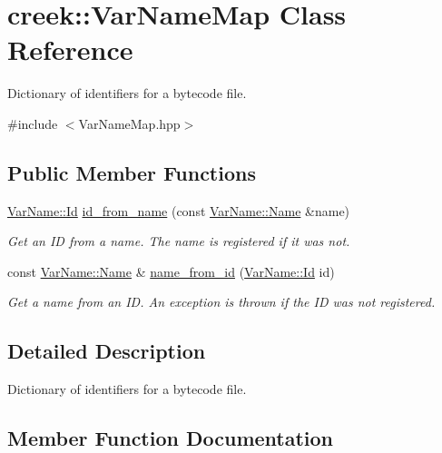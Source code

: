 \hypertarget{classcreek_1_1_var_name_map}{}\section{creek\+:\+:Var\+Name\+Map Class Reference}
\label{classcreek_1_1_var_name_map}


Dictionary of identifiers for a bytecode file.  




{\ttfamily \#include $<$Var\+Name\+Map.\+hpp$>$}

\subsection*{Public Member Functions}
\begin{DoxyCompactItemize}
\item 
\hyperlink{classcreek_1_1_var_name_a8dcbc9cf867fbb7e2f8202132de8690d}{Var\+Name\+::\+Id} \hyperlink{classcreek_1_1_var_name_map_a5fa021439f6311f5312eeb395b132063}{id\+\_\+from\+\_\+name} (const \hyperlink{classcreek_1_1_var_name_a9d09406258e87f40bc1fea0cbf9c86cc}{Var\+Name\+::\+Name} \&name)
\begin{DoxyCompactList}\small\item\em Get an ID from a name. The name is registered if it was not. \end{DoxyCompactList}\item 
const \hyperlink{classcreek_1_1_var_name_a9d09406258e87f40bc1fea0cbf9c86cc}{Var\+Name\+::\+Name} \& \hyperlink{classcreek_1_1_var_name_map_af9ccf46167af37014c5385afb10c74c8}{name\+\_\+from\+\_\+id} (\hyperlink{classcreek_1_1_var_name_a8dcbc9cf867fbb7e2f8202132de8690d}{Var\+Name\+::\+Id} id)
\begin{DoxyCompactList}\small\item\em Get a name from an ID. An exception is thrown if the ID was not registered. \end{DoxyCompactList}\end{DoxyCompactItemize}


\subsection{Detailed Description}
Dictionary of identifiers for a bytecode file. 

\subsection{Member Function Documentation}
